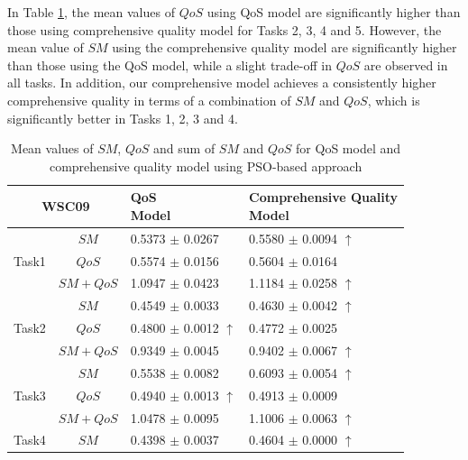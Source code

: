 In Table \ref{decisionTable}, the mean values of $QoS$ using QoS model are significantly higher than those using comprehensive quality model for Tasks 2, 3, 4 and 5. However, the mean value of $SM$ using the comprehensive quality model are significantly higher than those using the QoS model, while a slight trade-off in $QoS$ are observed in all tasks. In addition, our comprehensive model achieves a consistently higher comprehensive quality in terms of a combination of $SM$ and $QoS$, which is significantly better in Tasks 1, 2, 3 and 4. 
\begin{table}[]
\footnotesize
\centering
\caption{Mean values of $SM$, $QoS$ and sum of $SM$ and $QoS$ for QoS model and comprehensive quality model using PSO-based approach}
\label{decisionTable}
\begin{tabular}{c|c|l|l}
\hline
\multicolumn{2}{c|}{WSC09}              & \shortstack{QoS \\ Model}         &\shortstack{Comprehensive Quality \\ Model} \\ \hline
\multirow{3}{*}{Task1}  &$SM$      &0.5373 $\pm$ 0.0267               &0.5580 $\pm$ 0.0094 $\uparrow$ \\ \cline{2-4}
                        &$QoS$     &0.5574 $\pm$ 0.0156               &0.5604 $\pm$ 0.0164            \\ \cline{2-4}
                        &$SM+QoS$  &1.0947 $\pm$ 0.0423               &1.1184 $\pm$ 0.0258 $\uparrow$ \\ \hline
\multirow{3}{*}{Task2}  &$SM$      &0.4549 $\pm$ 0.0033               &0.4630 $\pm$ 0.0042 $\uparrow$ \\ \cline{2-4} 
                        &$QoS$     &0.4800 $\pm$ 0.0012 $\uparrow$    &0.4772 $\pm$ 0.0025            \\ \cline{2-4}
                        &$SM+QoS$  &0.9349 $\pm$ 0.0045               &0.9402 $\pm$ 0.0067 $\uparrow$           \\ \hline
\multirow{3}{*}{Task3}  &$SM$      &0.5538 $\pm$ 0.0082               &0.6093 $\pm$ 0.0054 $\uparrow$ \\ \cline{2-4} 
                        &$QoS$     &0.4940 $\pm$ 0.0013 $\uparrow$    &0.4913 $\pm$ 0.0009            \\ \cline{2-4}
                        &$SM+QoS$  &1.0478 $\pm$ 0.0095               &1.1006 $\pm$ 0.0063 $\uparrow$           \\ \hline
\multirow{3}{*}{Task4}  &$SM$      &0.4398 $\pm$ 0.0037               &0.4604 $\pm$ 0.0000 $\uparrow$ \\ \cline{2-4} 

\end{tabular}
\end{table}
